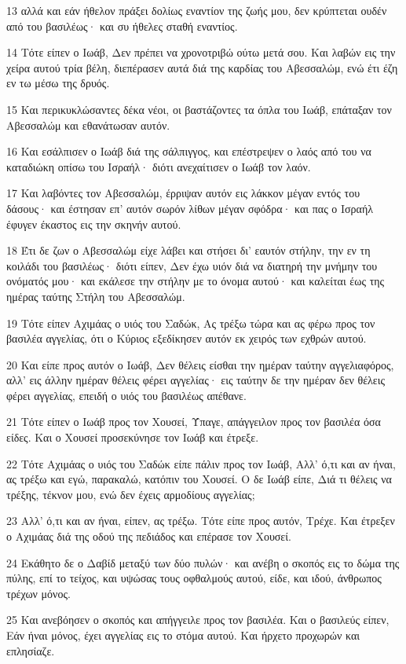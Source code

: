 \par 13 αλλά και εάν ήθελον πράξει δολίως εναντίον της ζωής μου, δεν κρύπτεται ουδέν από του βασιλέως· και συ ήθελες σταθή εναντίος.
\par 14 Τότε είπεν ο Ιωάβ, Δεν πρέπει να χρονοτριβώ ούτω μετά σου. Και λαβών εις την χείρα αυτού τρία βέλη, διεπέρασεν αυτά διά της καρδίας του Αβεσσαλώμ, ενώ έτι έζη εν τω μέσω της δρυός.
\par 15 Και περικυκλώσαντες δέκα νέοι, οι βαστάζοντες τα όπλα του Ιωάβ, επάταξαν τον Αβεσσαλώμ και εθανάτωσαν αυτόν.
\par 16 Και εσάλπισεν ο Ιωάβ διά της σάλπιγγος, και επέστρεψεν ο λαός από του να καταδιώκη οπίσω του Ισραήλ· διότι ανεχαίτισεν ο Ιωάβ τον λαόν.
\par 17 Και λαβόντες τον Αβεσσαλώμ, έρριψαν αυτόν εις λάκκον μέγαν εντός του δάσους· και έστησαν επ' αυτόν σωρόν λίθων μέγαν σφόδρα· και πας ο Ισραήλ έφυγεν έκαστος εις την σκηνήν αυτού.
\par 18 Έτι δε ζων ο Αβεσσαλώμ είχε λάβει και στήσει δι' εαυτόν στήλην, την εν τη κοιλάδι του βασιλέως· διότι είπεν, Δεν έχω υιόν διά να διατηρή την μνήμην του ονόματός μου· και εκάλεσε την στήλην με το όνομα αυτού· και καλείται έως της ημέρας ταύτης Στήλη του Αβεσσαλώμ.
\par 19 Τότε είπεν Αχιμάας ο υιός του Σαδώκ, Ας τρέξω τώρα και ας φέρω προς τον βασιλέα αγγελίας, ότι ο Κύριος εξεδίκησεν αυτόν εκ χειρός των εχθρών αυτού.
\par 20 Και είπε προς αυτόν ο Ιωάβ, Δεν θέλεις είσθαι την ημέραν ταύτην αγγελιαφόρος, αλλ' εις άλλην ημέραν θέλεις φέρει αγγελίας· εις ταύτην δε την ημέραν δεν θέλεις φέρει αγγελίας, επειδή ο υιός του βασιλέως απέθανε.
\par 21 Τότε είπεν ο Ιωάβ προς τον Χουσεί, Ύπαγε, απάγγειλον προς τον βασιλέα όσα είδες. Και ο Χουσεί προσεκύνησε τον Ιωάβ και έτρεξε.
\par 22 Τότε Αχιμάας ο υιός του Σαδώκ είπε πάλιν προς τον Ιωάβ, Αλλ' ό,τι και αν ήναι, ας τρέξω και εγώ, παρακαλώ, κατόπιν του Χουσεί. Ο δε Ιωάβ είπε, Διά τι θέλεις να τρέξης, τέκνον μου, ενώ δεν έχεις αρμοδίους αγγελίας;
\par 23 Αλλ' ό,τι και αν ήναι, είπεν, ας τρέξω. Τότε είπε προς αυτόν, Τρέχε. Και έτρεξεν ο Αχιμάας διά της οδού της πεδιάδος και επέρασε τον Χουσεί.
\par 24 Εκάθητο δε ο Δαβίδ μεταξύ των δύο πυλών· και ανέβη ο σκοπός εις το δώμα της πύλης, επί το τείχος, και υψώσας τους οφθαλμούς αυτού, είδε, και ιδού, άνθρωπος τρέχων μόνος.
\par 25 Και ανεβόησεν ο σκοπός και απήγγειλε προς τον βασιλέα. Και ο βασιλεύς είπεν, Εάν ήναι μόνος, έχει αγγελίας εις το στόμα αυτού. Και ήρχετο προχωρών και επλησίαζε.
